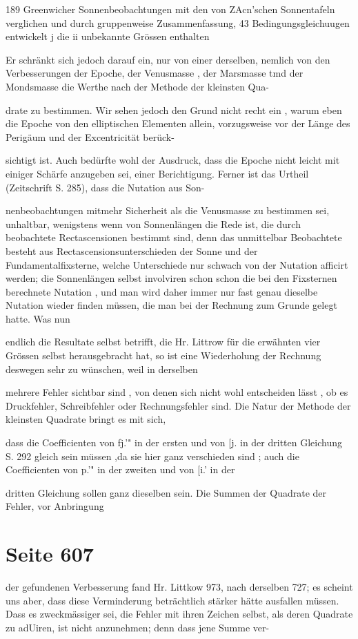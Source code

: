 \documentclass[10pt,a4paper]{article}
\begin{document}
189 Greenwicher Sonnenbeobachtungen mit den von ZAcn'schen Sonnentafeln verglichen und durch gruppenweise Zusammenfassung, 43 Bedingungsgleichuugen entwickelt j die ii unbekannte Grössen enthalten

Er schränkt sich jedoch darauf ein, nur von einer derselben, nemlich von den Verbesserungen der Epoche, der Venusmasse , der Marsmasse tmd der Mondsmasse die Werthe nach der Methode der kleinsten Qua-

drate zu bestimmen. Wir sehen jedoch den Grund nicht recht ein , warum eben die Epoche von den elliptischen Elementen allein, vorzugsweise vor der Länge des Perigäum und der Excentricität berück-

sichtigt ist. Auch bedürfte wohl der Ausdruck, dass die Epoche nicht leicht mit einiger Schärfe anzugeben sei, einer Berichtigung. Ferner ist das Urtheil (Zeitschrift S. 285), dass die Nutation aus Son-

nenbeobachtungen mitmehr Sicherheit als die Venusmasse zu bestimmen sei, unhaltbar, wenigstens wenn von Sonnenlängen die Rede ist, die durch beobachtete Rectascensionen bestimmt sind, denn das unmittelbar Beobachtete besteht aus Rectascensionsunterschieden der Sonne und der Fundamentalfixsterne, welche Unterschiede nur schwach von der Nutation afficirt werden; die Sonnenlängen selbst involviren schon schon die bei den Fixsternen berechnete Nutation , und man wird daher immer nur fast genau dieselbe Nutation wieder finden müssen, die man bei der Rechnung zum Grunde gelegt hatte. Was nun

endlich die Resultate selbst betrifft, die Hr. Littrow für die erwähnten vier Grössen selbst herausgebracht hat, so ist eine Wiederholung der Rechnung deswegen sehr zu wünschen, weil in derselben

mehrere Fehler sichtbar sind , von denen sich nicht wohl entscheiden lässt , ob es Druckfehler, Schreibfehler oder Rechnungsfehler sind. Die Natur der Methode der kleinsten Quadrate bringt es mit sich,

dass die Coefficienten von fj.'" in der ersten und von [j. in der dritten Gleichung S. 292 gleich sein müssen ,da sie hier ganz verschieden sind ; auch die Coefficienten von p.'" in der zweiten und von [i.' in der

dritten Gleichung sollen ganz dieselben sein. Die Summen der Quadrate der Fehler, vor Anbringung


\newpage
\section*{Seite 607}
der gefundenen Verbesserung fand Hr. Littkow 973, nach derselben 727; es scheint uns aber, dass diese Verminderung beträchtlich stärker hätte ausfallen müssen. Dass es zweckmässiger sei, die Fehler mit ihren Zeichen selbst, als deren Quadrate zu adUiren, ist nicht anzunehmen; denn dass jene Summe ver-
\end{document}
